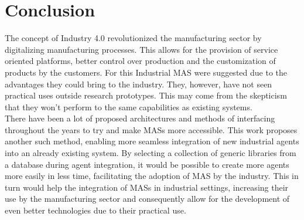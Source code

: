 

\glsresetall

\chapter{Conclusion}
\label{cha:conclusion}

The concept of Industry 4.0 revolutionized the manufacturing sector by digitalizing manufacturing processes. This allows for the provision of service oriented platforms, better control over production and the customization of products by the customers. For this Industrial \gls{MAS} were suggested due to the advantages they could bring to the industry. They, however, have not seen practical uses outside research prototypes. This may come from the skepticism that they won't perform to the same capabilities as existing systems.\\

There have been a lot of proposed architectures and methods of interfacing throughout the years to try and make \gls{MAS}s more accessible. This work proposes another such method, enabling more seamless integration of new industrial agents into an already existing system. By selecting a collection of generic libraries from a database during agent integration, it would be possible to create more agents more easily in less time, facilitating the adoption of \gls{MAS} by the industry. This in turn would help the integration of \gls{MAS}s in industrial settings, increasing their use by the manufacturing sector and consequently allow for the development of even better technologies due to their practical use.